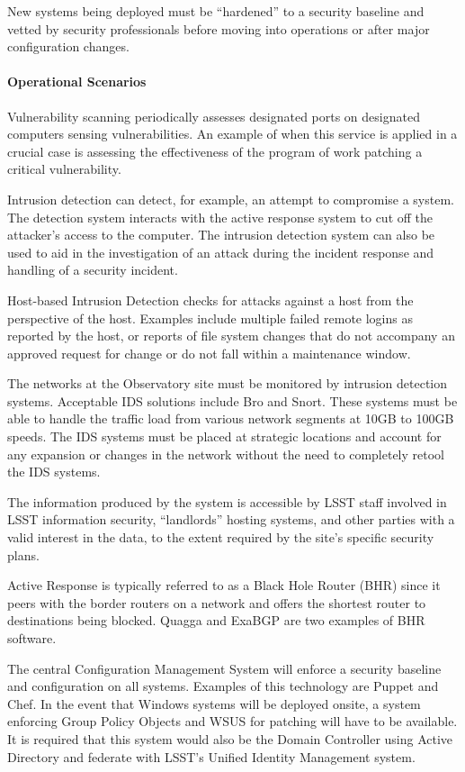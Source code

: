 New systems being deployed must be ``hardened'' to a security baseline and
vetted by security professionals before moving into operations or after major
configuration changes.

\paragraph{Operational Scenarios}

Vulnerability scanning periodically assesses designated ports on designated
computers sensing vulnerabilities. An example of when this service is applied in
a crucial case is assessing the effectiveness of the program of work patching a
critical vulnerability.

Intrusion detection can detect, for example, an attempt to compromise a system.
The detection system interacts with the active response system to cut off the
attacker’s access to the computer. The intrusion detection system can also be
used to aid in the investigation of an attack during the incident response and
handling of a security incident.

Host-based Intrusion Detection checks for attacks against a host from the
perspective of the host. Examples include multiple failed remote logins as reported
by the host, or reports of file system changes that do not accompany an approved
request for change or do not fall within a maintenance window.

The networks at the Observatory site must be monitored by intrusion detection
systems. Acceptable IDS solutions include Bro and Snort. These systems must be
able to handle the traffic load from various network segments at 10GB to 100GB
speeds. The IDS systems must be placed at strategic locations and account for
any expansion or changes in the network without the need to completely retool
the IDS systems.

The information produced by the system is accessible by LSST staff involved in
LSST information security, “landlords” hosting systems, and other parties with a
valid interest in the data, to the extent required by the site’s specific security plans.

Active Response is typically referred to as a Black Hole Router (BHR) since it peers
with the border routers on a network and offers the shortest router to
destinations being blocked.  Quagga and ExaBGP are two examples of BHR software.

The central Configuration Management System will enforce a security baseline and
configuration on all systems. Examples of this technology are Puppet and Chef.
In the event that Windows systems will be deployed onsite, a system enforcing
Group Policy Objects and WSUS for patching will have to be available. It is
required that this system would also be the Domain Controller using Active
Directory and federate with LSST’s Unified Identity Management system.


